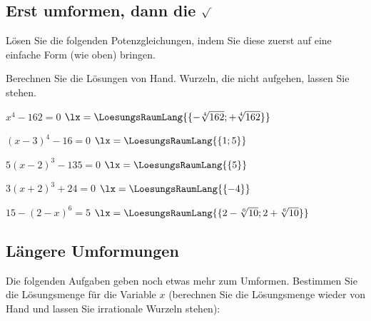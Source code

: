 \subsection{Erst umformen, dann die $\sqrt{\,\vphantom{b}}$}
Lösen Sie die folgenden Potenzgleichungen, indem Sie diese zuerst auf eine einfache Form (wie oben) bringen.

Berechnen Sie die Lösungen von Hand. Wurzeln, die nicht aufgehen, lassen Sie stehen.


\begin{bbwAufgabenBlock}

\item
 $x^4-162 = 0$ \hspace{10mm} $\lx=\LoesungsRaumLang{\{-\sqrt[4]{162}; +\sqrt[4]{162}\}}$

\item
 $(x-3)^4 - 16 = 0$ \hspace{10mm} $\lx=\LoesungsRaumLang{\{1; 5\}}$
 \noTRAINER{\newpage}

\item
 $5(x-2)^3 - 135 = 0$ \hspace{10mm} $\lx=\LoesungsRaumLang{\{5\}}$

\item
 $3(x+2)^3 + 24 = 0$ \hspace{10mm} $\lx=\LoesungsRaumLang{\{-4\}}$

\item
 $15-(2-x)^6 = 5$ \hspace{10mm} $\lx=\LoesungsRaumLang{\{2-\sqrt[6]{10}; 2+\sqrt[6]{10}\}}$

\end{bbwAufgabenBlock}

\noTRAINER{\newpage}

\subsection{Längere Umformungen}

Die folgenden Aufgaben geben noch etwas mehr zum Umformen. Bestimmen
Sie die Lösungsmenge für die Variable $x$ (berechnen Sie die
Lösungsmenge wieder von Hand und lassen Sie irrationale Wurzeln stehen):

